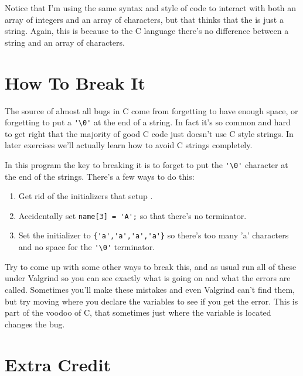 Notice that I'm using the same syntax and style of code to interact with both
an array of integers and an array of characters, but that  thinks
that the  is just a string.  Again, this is because to the C
language there's no difference between a string and an array of characters.

\section{How To Break It}

The source of almost all bugs in C come from forgetting to have enough
space, or forgetting to put a \verb|'\0'| at the end of a string.  In
fact it's so common and hard to get right that the majority of good C
code just doesn't use C style strings.  In later exercises we'll actually
learn how to avoid C strings completely.

In this program the key to breaking it is to forget to put the \verb|'\0'|
character at the end of the strings.  There's a few ways to do this:

\begin{enumerate}
\item Get rid of the initializers that setup .
\item Accidentally set \verb|name[3] = 'A';| so that there's no terminator.
\item Set the initializer to \verb|{'a','a','a','a'}| so there's too many
    'a' characters and no space for the \verb|'\0'| terminator.
\end{enumerate}

Try to come up with some other ways to break this, and as usual run all of
these under Valgrind so you can see exactly what is going on and what the
errors are called.  Sometimes you'll make these mistakes and even
Valgrind can't find them, but try moving where you declare the variables
to see if you get the error.  This is part of the voodoo of C, that
sometimes just where the variable is located changes the bug.

\section{Extra Credit}

